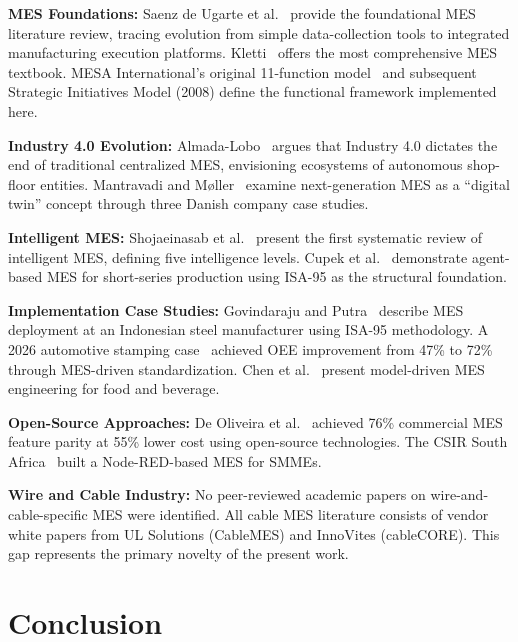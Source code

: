 \documentclass[11pt]{article}
\begin{document}
\textbf{MES Foundations:} Saenz de Ugarte et al.~\cite{saenz2009} provide the foundational MES literature review, tracing evolution from simple data-collection tools to integrated manufacturing execution platforms. Kletti~\cite{kletti2007} offers the most comprehensive MES textbook. MESA International's original 11-function model~\cite{mesa1997} and subsequent Strategic Initiatives Model (2008) define the functional framework implemented here.

\textbf{Industry 4.0 Evolution:} Almada-Lobo~\cite{almada2016} argues that Industry 4.0 dictates the end of traditional centralized MES, envisioning ecosystems of autonomous shop-floor entities. Mantravadi and M{\o}ller~\cite{mantravadi2019} examine next-generation MES as a ``digital twin'' concept through three Danish company case studies.

\textbf{Intelligent MES:} Shojaeinasab et al.~\cite{shojaeinasab2022} present the first systematic review of intelligent MES, defining five intelligence levels. Cupek et al.~\cite{cupek2016} demonstrate agent-based MES for short-series production using ISA-95 as the structural foundation.

\textbf{Implementation Case Studies:} Govindaraju and Putra~\cite{govindaraju2016} describe MES deployment at an Indonesian steel manufacturer using ISA-95 methodology. A 2026 automotive stamping case~\cite{auto2026} achieved OEE improvement from 47\% to 72\% through MES-driven standardization. Chen et al.~\cite{chen2021} present model-driven MES engineering for food and beverage.

\textbf{Open-Source Approaches:} De Oliveira et al.~\cite{deoliveira2019} achieved 76\% commercial MES feature parity at 55\% lower cost using open-source technologies. The CSIR South Africa~\cite{csir2022} built a Node-RED-based MES for SMMEs.

\textbf{Wire and Cable Industry:} No peer-reviewed academic papers on wire-and-cable-specific MES were identified. All cable MES literature consists of vendor white papers from UL Solutions (CableMES) and InnoVites (cableCORE). This gap represents the primary novelty of the present work.


\section{Conclusion}
\end{document}
